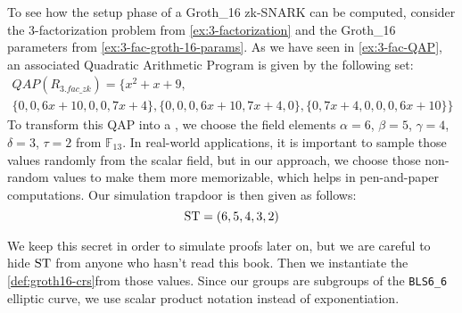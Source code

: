 \begin{example}
To see how the setup phase of a Groth\_16 zk-SNARK can be computed, consider the $3$-factorization problem from \ref{ex:3-factorization} and the Groth\_16 parameters from \examplename{} \ref{ex:3-fac-groth-16-params}. As we have seen in \ref{ex:3-fac-QAP}, an associated Quadratic Arithmetic Program is given by the following set:
\begin{multline*}
QAP(R_{3.fac\_zk}) =\{x^{2}+x+9,\\
 \{0,0,6x+10,0,0,7x+4\},\{0,0,0,6x+10,7x+4,0\},\{0,7x+4,0,0,0,6x+10\}\}
\end{multline*}
To transform this QAP into a , we choose the  field elements $\alpha=6$, $\beta=5$, $\gamma=4$, $\delta=3$, $\tau=2$ from $\mathbb{F}_{13}$. 
In real-world applications, it is important to sample those values randomly from the scalar field, but in our approach, we choose those non-random values to make them more memorizable, which helps in pen-and-paper computations. Our simulation trapdoor is then given as follows:
$$
\mathrm{ST} = (6,5,4,3,2)
$$

We keep this secret in order to simulate proofs later on, but we are careful to hide $\mathrm{ST}$ from anyone who hasn't read this book. Then we instantiate the  \ref{def:groth16-crs}from those values. Since our groups are subgroups of the \texttt{BLS6\_6} elliptic curve, we use scalar product notation instead of exponentiation. 


\end{example}
